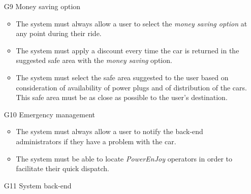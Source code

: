 \begin{itemize}
				\item [G9] Money saving option %
					\begin{itemize}
						\item The system must always allow a user to select the \textit{money saving option} at any point during their ride. 
						\item The system must apply a discount every time the car is returned in the suggested safe area with the \textit{money saving} option.
						\item The system must select the safe area suggested to the user based on consideration of availability of power plugs and of distribution of the cars. This safe area must be as close as possible to the user's destination. %
					\end{itemize}
					
				\item [G10] Emergency management %
					\begin{itemize}
						\item The system must always allow a user to notify the back-end administrators if they have a problem with the car.
						\item The system must be able to locate \textit{PowerEnJoy} operators in order to facilitate their quick dispatch.
					\end{itemize}
					
				\item [G11] System back-end %

\end{itemize}














